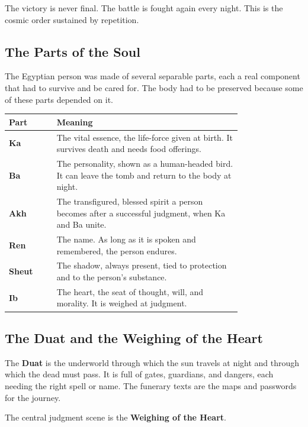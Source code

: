 The victory is never final. The battle is fought again every night. This is the cosmic order sustained by repetition.

\subsection{The Parts of the Soul}

The Egyptian person was made of several separable parts, each a real component that had to survive and be cared for. The body had to be preserved because some of these parts depended on it.

\begin{longtable}{L{0.16\linewidth}
L{0.62\linewidth}}
\toprule
\textbf{Part} & \textbf{Meaning} \\
\midrule
\textbf{Ka} & The vital essence, the life-force given at birth. It survives death and needs food offerings. \\
\textbf{Ba} & The personality, shown as a human-headed bird. It can leave the tomb and return to the body at night. \\
\textbf{Akh} & The transfigured, blessed spirit a person becomes after a successful judgment, when Ka and Ba unite. \\
\textbf{Ren} & The name. As long as it is spoken and remembered, the person endures. \\
\textbf{Sheut} & The shadow, always present, tied to protection and to the person's substance. \\
\textbf{Ib} & The heart, the seat of thought, will, and morality. It is weighed at judgment. \\
\bottomrule
\end{longtable}

\subsection{The Duat and the Weighing of the Heart}

The \textbf{Duat} is the underworld through which the sun travels at night and through which the dead must pass. It is full of gates, guardians, and dangers, each needing the right spell or name. The funerary texts are the maps and passwords for the journey.

The central judgment scene is the \textbf{Weighing of the Heart}.

